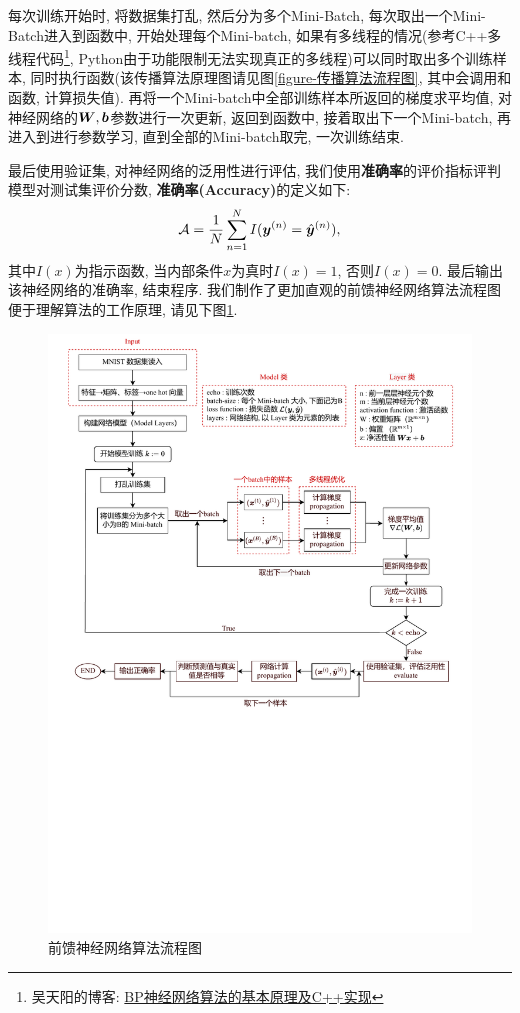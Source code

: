\documentclass[12pt, a4paper, oneside]{ctexart}
\begin{document}
每次训练开始时, 将数据集打乱, 然后分为多个Mini-Batch, 每次取出一个Mini-Batch进入到函数中, 开始处理每个Mini-batch, 如果有多线程的情况(参考C++多线程代码\footnote[2]{吴天阳的博客: \href{https://wty-yy.github.io/posts/2534/}{BP神经网络算法的基本原理及C++实现}}, Python由于功能限制无法实现真正的多线程)可以同时取出多个训练样本, 同时执行函数(该传播算法原理图请见图\ref{figure-传播算法流程图}, 其中会调用和函数, 计算损失值). 再将一个Mini-batch中全部训练样本所返回的梯度求平均值, 对神经网络的$\boldsymbol{W}, \boldsymbol{b}$参数进行一次更新, 返回到函数中, 接着取出下一个Mini-batch, 再进入到进行参数学习, 直到全部的Mini-batch取完, 一次训练结束.

最后使用验证集, 对神经网络的泛用性进行评估, 我们使用\textbf{准确率}的评价指标评判模型对测试集评价分数, \textbf{准确率(Accuracy)}的定义如下:
\begin{equation}
    \mathcal{A} = \frac{1}{N}\sum_{n=1}^NI(\boldsymbol{y}^{(n)} = \hat{\boldsymbol{y}}^{(n)}),
\end{equation}
其中$I(x)$为指示函数, 当内部条件$x$为真时$I(x) = 1$, 否则$I(x) = 0$. 最后输出该神经网络的准确率, 结束程序. 我们制作了更加直观的前馈神经网络算法流程图便于理解算法的工作原理, 请见下图\ref{figure-前馈神经网络算法}.
\begin{figure}[htbp]
    \centering
    \includegraphics[scale=0.8]{前馈神经网络算法.pdf}
    \caption{前馈神经网络算法流程图}
    \label{figure-前馈神经网络算法}
\end{figure}\del
\end{document}

